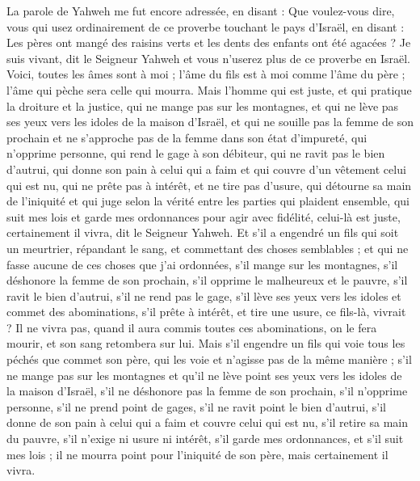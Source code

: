 \begin{multicols}{2}
\VerseOne{}La parole de Yahweh me fut encore adressée, en disant :
Que voulez-vous dire, vous qui usez ordinairement de ce proverbe touchant le pays d'Israël, en disant : Les pères ont mangé des raisins verts et les dents des enfants ont été agacées ?
Je suis vivant, dit le Seigneur Yahweh et vous n'userez plus de ce proverbe en Israël.
Voici, toutes les âmes sont à moi ; l'âme du fils est à moi comme l'âme du père ; l'âme qui pèche sera celle qui mourra.
Mais l'homme qui est juste, et qui pratique la droiture et la justice,
qui ne mange pas sur les montagnes, et qui ne lève pas ses yeux vers les idoles de la maison d'Israël, et qui ne souille pas la femme de son prochain et ne s'approche pas de la femme dans son état d'impureté,
qui n'opprime personne, qui rend le gage à son débiteur, qui ne ravit pas le bien d'autrui, qui donne son pain à celui qui a faim et qui couvre d'un vêtement celui qui est nu,
qui ne prête pas à intérêt, et ne tire pas d'usure, qui détourne sa main de l'iniquité et qui juge selon la vérité entre les parties qui plaident ensemble,
qui suit mes lois et garde mes ordonnances pour agir avec fidélité, celui-là est juste, certainement il vivra, dit le Seigneur Yahweh.
Et s'il a engendré un fils qui soit un meurtrier, répandant le sang, et commettant des choses semblables ;
et qui ne fasse aucune de ces choses que j'ai ordonnées, s'il mange sur les montagnes, s'il déshonore la femme de son prochain,
s'il opprime le malheureux et le pauvre, s'il ravit le bien d'autrui, s'il ne rend pas le gage, s'il lève ses yeux vers les idoles et commet des abominations,
s'il prête à intérêt, et tire une usure, ce fils-là, vivrait ? Il ne vivra pas, quand il aura commis toutes ces abominations, on le fera mourir, et son sang retombera sur lui.
Mais s'il engendre un fils qui voie tous les péchés que commet son père, qui les voie et n'agisse pas de la même manière ;
s'il ne mange pas sur les montagnes et qu'il ne lève point ses yeux vers les idoles de la maison d'Israël, s'il ne déshonore pas la femme de son prochain,
s'il n'opprime personne, s'il ne prend point de gages, s'il ne ravit point le bien d'autrui, s'il donne de son pain à celui qui a faim et couvre celui qui est nu,
s'il retire sa main du pauvre, s'il n'exige ni usure ni intérêt, s'il garde mes ordonnances, et s'il suit mes lois ; il ne mourra point pour l'iniquité de son père, mais certainement il vivra.

\end{multicols}

